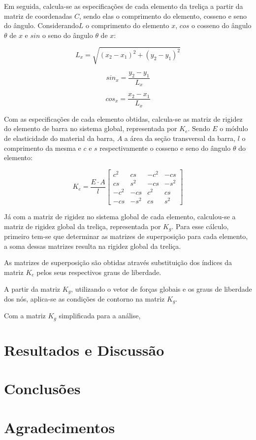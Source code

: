 \documentclass[paper=a4, fontsize=11pt]{scrartcl}
\begin{document}
Em seguida, calcula-se as especificações de cada elemento da treliça a partir da matriz de coordenadas \(C\), sendo elas o comprimento do elemento, cosseno e seno do ângulo. Considerando\(L\) o comprimento do elemento \(x\), \(cos\) o cosseno do ângulo \(\theta\) de \(x\) e \(sin\) o seno do ângulo \(\theta\) de \(x\):

\[L_x = \sqrt{(x_2 - x_1)^2 + (y_2 - y_1)^2}\]

\[sin_x = \frac{y_2 - y_1}{L_x}\]

\[cos_x = \frac{x_2 - x_1}{L_x} \]

Com as especificações de cada elemento obtidas, calcula-se as matriz de rigidez do elemento de barra no sistema global, representada por \(K_e\). Sendo \(E\) o módulo de elasticidade do material da barra, \(A\) a área da seção transversal da barra, \(l\) o comprimento da mesma e \(c\) e \(s\) respectivamente o cosseno e seno do ângulo \(\theta\) do elemento:

\[K_e = \frac{E \cdot A}{l}
\begin{bmatrix}
c^2 & cs & -c^2 & -cs\\
cs & s^2 & -cs & -s^2 \\
-c^2 & -cs & c^2 & cs \\
-cs & -s^2 & cs & s^2
\end{bmatrix}
\]

Já com a matriz de rigidez no sistema global de cada elemento, calculou-se a matriz de rigidez global da treliça, representada por \(K_g\). Para esse cálculo, primeiro tem-se que determinar as matrizes de superposição para cada elemento, a soma dessas matrizes resulta na rigidez global da treliça. 

As matrizes de superposição são obtidas através substituição dos índices da matriz \(K_e\) pelos seus respectivos graus de liberdade.

A partir da matriz \(K_g\), utilizando o vetor de forças globais e os graus de liberdade dos nós, aplica-se as condições de contorno na matriz \(K_g\).

Com a matriz \(K_g\) simplificada para a análise, 


\section{Resultados e Discussão}

\section{Conclusões}

\section{Agradecimentos} 

{}


\end{document}
